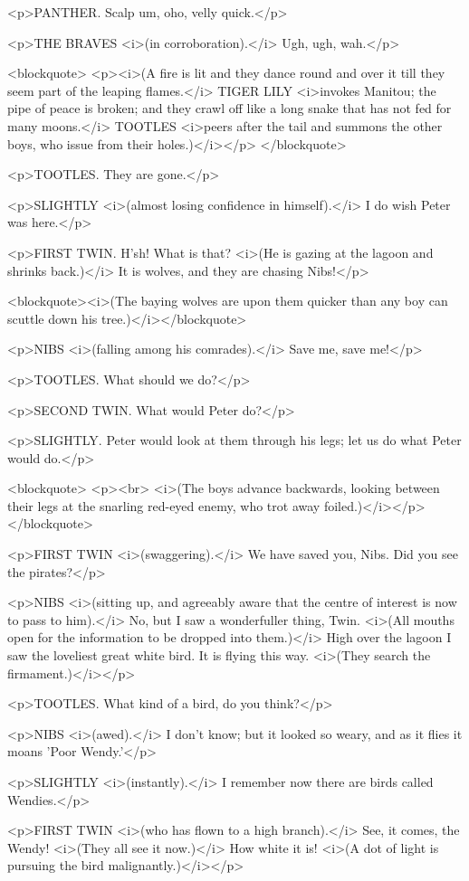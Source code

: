 <p>PANTHER. Scalp um, oho, velly quick.</p>

<p>THE BRAVES <i>(in corroboration).</i> Ugh, ugh, wah.</p>

<blockquote>
<p><i>(A fire is lit and they dance round and over it till they seem
part of the leaping flames.</i> TIGER LILY <i>invokes Manitou; the
pipe of peace is broken; and they crawl off like a long snake that
has not fed for many moons.</i> TOOTLES <i>peers after the tail and
summons the other boys, who issue from their holes.)</i></p>
</blockquote>

<p>TOOTLES. They are gone.</p>

<p>SLIGHTLY <i>(almost losing confidence in himself).</i> I do wish
Peter was here.</p>

<p>FIRST TWIN. H'sh! What is that? <i>(He is gazing at the lagoon and
shrinks back.)</i> It is wolves, and they are chasing Nibs!</p>

<blockquote><i>(The baying wolves are upon them quicker than any boy
can scuttle down his tree.)</i></blockquote>

<p>NIBS <i>(falling among his comrades).</i> Save me, save me!</p>

<p>TOOTLES. What should we do?</p>

<p>SECOND TWIN. What would Peter do?</p>

<p>SLIGHTLY. Peter would look at them through his legs; let us do
what Peter would do.</p>

<blockquote>
<p><br>
 <i>(The boys advance backwards, looking between their legs at the
snarling red-eyed enemy, who trot away foiled.)</i></p>
</blockquote>

<p>FIRST TWIN <i>(swaggering).</i> We have saved you, Nibs. Did you
see the pirates?</p>

<p>NIBS <i>(sitting up, and agreeably aware that the centre of
interest is now to pass to him).</i> No, but I saw a wonderfuller
thing, Twin. <i>(All mouths open for the information to be dropped
into them.)</i> High over the lagoon I saw the loveliest great white
bird. It is flying this way. <i>(They search the firmament.)</i></p>

<p>TOOTLES. What kind of a bird, do you think?</p>

<p>NIBS <i>(awed).</i> I don't know; but it looked so weary, and as
it flies it moans 'Poor Wendy.'</p>

<p>SLIGHTLY <i>(instantly).</i> I remember now there are birds called
Wendies.</p>

<p>FIRST TWIN <i>(who has flown to a high branch).</i> See, it comes,
the Wendy! <i>(They all see it now.)</i> How white it is! <i>(A dot
of light is pursuing the bird malignantly.)</i></p>

